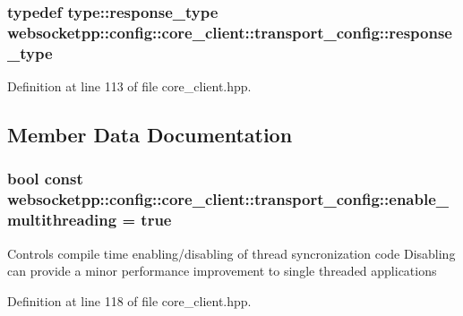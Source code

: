 \subsubsection[{response\+\_\+type}]{\setlength{\rightskip}{0pt plus 5cm}typedef {\bf type\+::response\+\_\+type} {\bf websocketpp\+::config\+::core\+\_\+client\+::transport\+\_\+config\+::response\+\_\+type}}\label{structwebsocketpp_1_1config_1_1core__client_1_1transport__config_ae2a3007f9ac70a89ce353db54dda0ad8}


Definition at line 113 of file core\+\_\+client.\+hpp.



\subsection{Member Data Documentation}
\hypertarget{structwebsocketpp_1_1config_1_1core__client_1_1transport__config_a79238a5db7c8a95065e998309b4f424c}{}
\subsubsection[{enable\+\_\+multithreading}]{\setlength{\rightskip}{0pt plus 5cm}bool const websocketpp\+::config\+::core\+\_\+client\+::transport\+\_\+config\+::enable\+\_\+multithreading = true\hspace{0.3cm}{\ttfamily [static]}}\label{structwebsocketpp_1_1config_1_1core__client_1_1transport__config_a79238a5db7c8a95065e998309b4f424c}
Controls compile time enabling/disabling of thread syncronization code Disabling can provide a minor performance improvement to single threaded applications 

Definition at line 118 of file core\+\_\+client.\+hpp.

\hypertarget{structwebsocketpp_1_1config_1_1core__client_1_1transport__config_ab5516b1f6e73f0e7e3b66ec6cb759a94}{}
